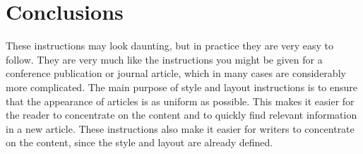 
\section{Conclusions}\label{sec:conclusions}
These instructions may look daunting, but in practice they are very easy to follow.
They are very much like the instructions you might be given for a conference publication or journal article, which in many cases are considerably more complicated.
The main purpose of style and layout instructions is to ensure that the appearance of articles is as uniform as possible.
This makes it easier for the reader to concentrate on the content and to quickly find relevant information in a new article.
These instructions also make it easier for writers to concentrate on the content, since the style and layout are already defined.
